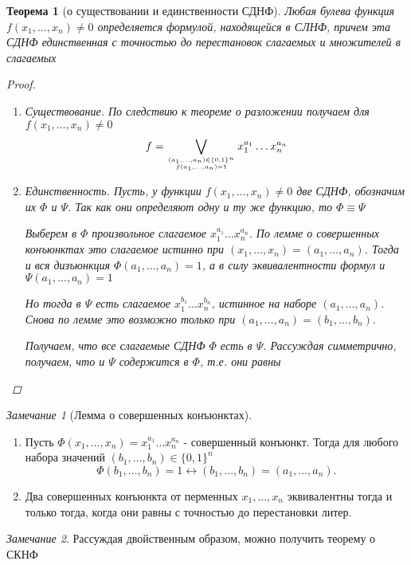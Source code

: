 \documentclass[a4paper]{article}
\newtheorem{theorem}{Теорема}[section]
\theoremstyle{definition}
\theoremstyle{remark}
\newtheorem*{remark}{Замечание}
\begin{document}
	\begin{theorem}[о существовании и единственности СДНФ]
		Любая булева функция $f(x_1, \dots , x_n) \neq 0$ определяется формулой, находящейся в СЛНФ, причем эта СДНФ единственная с точностью до перестановок слагаемых и множителей в слагаемых
		\begin{proof}
			\begin{enumerate}
				\item Существование. По следствию к теореме о разложении получаем для $f(x_1, \dots , x_n) \neq 0$
					$$f = \bigvee_{(a_1, \dots , a_n) \in \{0, 1\}^n\atop{f(a_1, \dots , a_n) = 1}} x_1^{a_1} \dots  x_n^{a_n}$$
				\item Единственность. Пусть, у функции $f(x_1, \dots , x_n) \neq 0$ две СДНФ, обозначим их $\Phi$ и $\Psi$. Так как они определяют одну и ту же функцию, то $\Phi \equiv \Psi$

					Выберем в $\Phi$ произвольное слагаемое $x_1^{a_1}\dots x_n^{a_n}$. По лемме о совершенных конъюнктах это слагаемое истинно при $(x_1, \dots , x_n) = (a_1, \dots , a_n)$. Тогда и вся дизъюнкция $\Phi(a_1, \dots , a_n) = 1$, а в силу эквивалентности формул и $\Psi(a_1, \dots , a_n) = 1$

					Но тогда в $\Psi$ есть слагаемое $x_1^{b_1}\dots x_n^{b_n}$, истинное на наборе $(a_1, \dots , a_n)$. Снова по лемме это возможно только при $(a_1, \dots , a_n)  = (b_1, \dots , b_n).$

					Получаем, что все слагаемые СДНФ $\Phi$ есть в $\Psi$. Рассуждая симметрично, получаем, что и $\Psi$ содержится в $\Phi$, т.е. они равны
			\end{enumerate}
		\end{proof}
	\end{theorem}
	\begin{remark}[Лемма о совершенных конъюнктах]
		\begin{enumerate}
            \item Пусть $\Phi(x_1, \dots , x_n) =  x_1^{a_1}\dots x_n^{a_n}$ - совершенный конъюнкт. 
            Тогда для любого набора значений $(b_1, \dots , b_n) \in \{0, 1\}^n$ $$ \Phi(b_1, \dots , b_n) = 1 \leftrightarrow (b_1, \dots , b_n) = (a_1, \dots , a_n).$$
            \item Два совершенных конъюнкта от перменных $x_1, \dots , x_n$ эквивалентны 
            тогда и только тогда, когда они равны с точностью до перестановки литер.
        \end{enumerate}
	\end{remark}
	\begin{remark}
		Рассуждая двойственным образом, можно получить теорему о СКНФ
	\end{remark}
\end{document}

